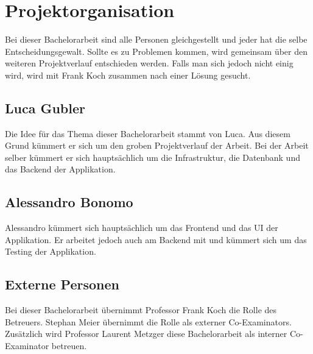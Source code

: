 \section{Projektorganisation}
Bei dieser Bachelorarbeit sind alle Personen gleichgestellt und jeder hat die selbe Entscheidungsgewalt. Sollte es zu Problemen kommen, wird gemeinsam über den weiteren Projektverlauf entschieden werden. Falls man sich jedoch nicht einig wird, wird mit Frank Koch zusammen nach einer Lösung gesucht.

\subsection*{Luca Gubler}
Die Idee für das Thema dieser Bachelorarbeit stammt von Luca. Aus diesem Grund kümmert er sich um den groben Projektverlauf der Arbeit. Bei der Arbeit selber kümmert er sich hauptsächlich um die Infrastruktur, die Datenbank und das Backend der Applikation.

\subsection*{Alessandro Bonomo}
Alessandro kümmert sich hauptsächlich um das Frontend und das UI der Applikation. Er arbeitet jedoch auch am Backend mit und kümmert sich um das Testing der Applikation.

\subsection*{Externe Personen}
Bei dieser Bachelorarbeit übernimmt Professor Frank Koch die Rolle des Betreuers. Stephan Meier übernimmt die Rolle als externer Co-Examinators. Zusätzlich wird Professor Laurent Metzger diese Bachelorarbeit als interner Co-Examinator betreuen.


\newpage